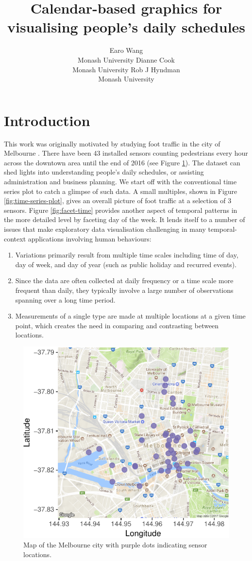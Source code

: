 \documentclass[article]{jss}
\author{
Earo Wang\\Monash University \And Dianne Cook\\Monash University \And Rob J Hyndman\\Monash University
}
\title{Calendar-based graphics for visualising people's daily schedules}
\providecommand{\tightlist}{%
  \setlength{\itemsep}{0pt}\setlength{\parskip}{0pt}}
\begin{document}
\section{Introduction}\label{introduction}

This work was originally motivated by studying foot traffic in the city
of Melbourne \citep{ped}. There have been 43 installed sensors counting
pedestrians every hour across the downtown area until the end of 2016
(see Figure \ref{fig:ped-map}). The dataset can shed lights into
understanding people's daily schedules, or assisting administration and
business planning. We start off with the conventional time series plot
to catch a glimpse of such data. A small multiples, shown in Figure
\ref{fig:time-series-plot}, gives an overall picture of foot traffic at
a selection of 3 sensors. Figure \ref{fig:facet-time} provides another
aspect of temporal patterns in the more detailed level by faceting day
of the week. It lends itself to a number of issues that make exploratory
data visualisation challenging in many temporal-context applications
involving human behaviours:

\begin{enumerate}
\def\labelenumi{\arabic{enumi}.}
\tightlist
\item
  Variations primarily result from multiple time scales including time
  of day, day of week, and day of year (such as public holiday and
  recurred events).
\item
  Since the data are often collected at daily frequency or a time scale
  more frequent than daily, they typically involve a large number of
  observations spanning over a long time period.
\item
  Measurements of a single type are made at multiple locations at a
  given time point, which creates the need in comparing and contrasting
  between locations.
\end{enumerate}

\begin{CodeChunk}
\begin{figure}

{\centering \includegraphics[width=0.55\linewidth]{figure/ped-map-1} 

}

\caption[Map of the Melbourne city with purple dots indicating sensor locations]{Map of the Melbourne city with purple dots indicating sensor locations.}\label{fig:ped-map}
\end{figure}
\end{CodeChunk}
\end{document}

